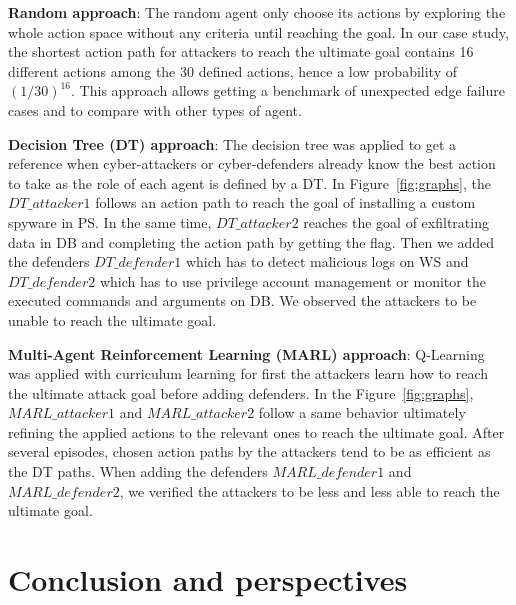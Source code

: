 \documentclass[conference]{IEEEtran}
\begin{document}

\noindent
\textbf{Random approach}: \quad The random agent only choose its actions by exploring the whole action space without any criteria until reaching the goal. In our case study, the shortest action path for attackers to reach the ultimate goal contains 16 different actions among the 30 defined actions, hence a low probability of $(1/30)^{16}$.
This approach allows getting a benchmark of unexpected edge failure cases and to compare with other types of agent.

\noindent
\textbf{Decision Tree (DT) approach}: \quad The decision tree was applied to get a reference when cyber-attackers or cyber-defenders already know the best action to take as the role of each agent is defined by a DT.
In Figure~\ref{fig:graphs}, the $DT\_attacker1$ follows an action path to reach the goal of installing a custom spyware in PS. In the same time, $DT\_attacker2$ reaches the goal of exfiltrating data in DB and completing the action path by getting the flag. Then we added the defenders $DT\_defender1$ which has to detect malicious logs on WS and $DT\_defender2$ which has to use privilege account management or monitor the executed commands and arguments on DB. We observed the attackers to be unable to reach the ultimate goal.

\noindent
\textbf{Multi-Agent Reinforcement Learning (MARL) approach}: \quad Q-Learning~\cite{CWatkins1992} was applied with curriculum learning for first the attackers learn how to reach the ultimate attack goal before adding defenders.
In the Figure~\ref{fig:graphs}, $MARL\_attacker1$ and $MARL\_attacker2$ follow a same behavior ultimately refining the applied actions to the relevant ones to reach the ultimate goal. After several episodes, chosen action paths by the attackers tend to be as efficient as the DT paths. When adding the defenders $MARL\_defender1$ and $MARL\_defender2$, we verified the attackers to be less and less able to reach the ultimate goal.


\section{Conclusion and perspectives}
\end{document}
